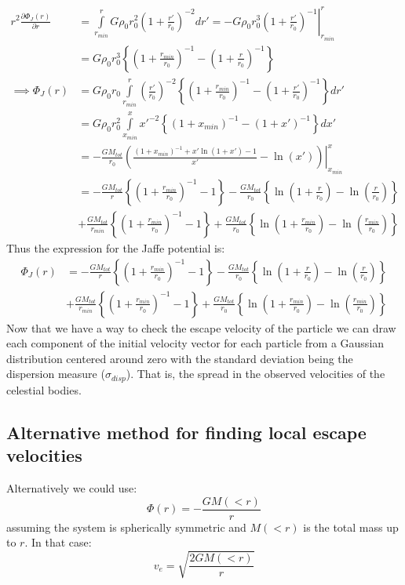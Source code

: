 \documentclass[]{article}
\begin{document}
\begin{align*}
	r^2\frac{\partial\Phi_{J}(r)}{\partial r} &= \int\limits_{r_{min}}^{r}G\rho_0r_0^{2}\left(1+\frac{r'}{r_0}\right)^{-2}dr' = -G\rho_0r_0^{3}\left.\left(1+\frac{r'}{r_0}\right)^{-1}\right|_{r_{min}}^{r}\\
	&= G\rho_0r_0^{3}\left\{\left(1+\frac{r_{min}}{r_0}\right)^{-1} - \left(1+\frac{r}{r_0}\right)^{-1}\right\}\\
	\implies \Phi_J(r) &= G\rho_0r_0\int\limits_{r_{min}}^{r}\left(\frac{r'}{r_0}\right)^{-2}\left\{\left(1+\frac{r_{min}}{r_0}\right)^{-1} - \left(1+\frac{r'}{r_0}\right)^{-1}\right\}dr'\\
	&= G\rho_0r_0^2\int\limits_{x_{min}}^{x}x'^{-2}\left\{\left(1+x_{min}\right)^{-1} - \left(1+x'\right)^{-1}\right\}dx'\\
	&= -\frac{GM_{tot}}{r_0}\left.\left(\frac{\left(1+x_{min}\right)^{-1}+x'\ln(1+x')-1}{x'}-\ln(x')\right)\right|_{x_{min}}^{x}\\
	&= -\frac{GM_{tot}}{r}\left\{\left(1+\frac{r_{min}}{r_0}\right)^{-1} - 1\right\}-\frac{GM_{tot}}{r_0}\left\{\ln\left(1+\frac{r}{r_0}\right)-\ln\left(\frac{r}{r_0}\right)\right\}\\
	& + \frac{GM_{tot}}{r_{min}}\left\{\left(1+\frac{r_{min}}{r_0}\right)^{-1} - 1\right\} + \frac{GM_{tot}}{r_0}\left\{\ln\left(1+\frac{r_{min}}{r_0}\right)-\ln\left(\frac{r_{min}}{r_0}\right)\right\}
\end{align*}
Thus the expression for the Jaffe potential is:
\begin{align}
	\Phi_J(r) &= -\frac{GM_{tot}}{r}\left\{\left(1+\frac{r_{min}}{r_0}\right)^{-1} - 1\right\}-\frac{GM_{tot}}{r_0}\left\{\ln\left(1+\frac{r}{r_0}\right)-\ln\left(\frac{r}{r_0}\right)\right\}\nonumber\\
	& + \frac{GM_{tot}}{r_{min}}\left\{\left(1+\frac{r_{min}}{r_0}\right)^{-1} - 1\right\} + \frac{GM_{tot}}{r_0}\left\{\ln\left(1+\frac{r_{min}}{r_0}\right)-\ln\left(\frac{r_{min}}{r_0}\right)\right\}
\end{align}
Now that we have a way to check the escape velocity of the particle we can draw each component of the initial velocity vector for each particle from a Gaussian distribution centered around zero with the standard deviation being the dispersion measure ($\sigma_{disp}$). That is, the spread in the observed velocities of the celestial bodies.

\subsection{Alternative method for finding local escape velocities}
Alternatively we could use:
\begin{equation*}
	\Phi(r) = -\frac{GM(<r)}{r}
\end{equation*} 
assuming the system is spherically symmetric and $M(<r)$ is the total mass up to $r$. In that case:
\begin{equation*}
	v_e = \sqrt{\frac{2GM(<r)}{r}}
\end{equation*}
\end{document}
